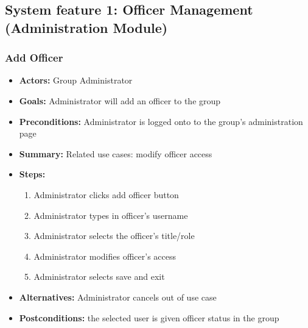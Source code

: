 \subsection{System feature 1: Officer Management (Administration
			Module)}
			\subsubsection{Add Officer}
			\begin{itemize}
				\item{\textbf{Actors:} Group Administrator}
				\item{\textbf{Goals:} Administrator will add an officer
					to the group}
				\item{\textbf{Preconditions:} Administrator is logged onto
					to the group's administration page}
				\item{\textbf{Summary:} Related use cases: modify officer
					access}
				\item{\textbf{Steps:}
				\begin{enumerate}
					\item{Administrator clicks add officer button}
					\item{Administrator types in officer's username}
					\item{Administrator selects the officer's title/role}
					\item{Administrator modifies officer's access}
					\item{Administrator selects save and exit}
				\end{enumerate}
				}
				\item{\textbf{Alternatives:} Administrator cancels out of
					use case}
				\item{\textbf{Postconditions:} the selected user is given
					officer status in the group}
			\end{itemize}
